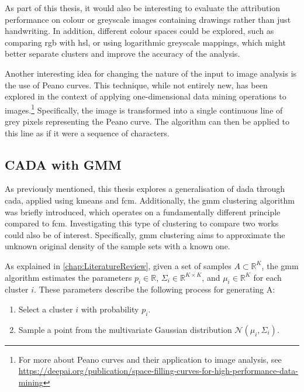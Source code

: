 \begin{toReview}
\noindent As part of this thesis, it would also be interesting to evaluate the attribution performance on colour or greyscale images containing drawings rather than just handwriting. In addition, different colour spaces could be explored, such as comparing \gls{rgb} with \gls{hsl}, or using logarithmic greyscale mappings, which might better separate clusters and improve the accuracy of the analysis.

\noindent Another interesting idea for changing the nature of the input to image analysis is the use of Peano curves. This technique, while not entirely new, has been explored in the context of applying one-dimensional data mining operations to images.\footnote{For more about Peano curves and their application to image analysis, see \\ \url{https://deepai.org/publication/space-filling-curves-for-high-performance-data-mining}} Specifically, the image is transformed into a single continuous line of grey pixels representing the Peano curve. The algorithm can then be applied to this line as if it were a sequence of characters.

\subsection{CADA with GMM}
As previously mentioned, this thesis explores a generalisation of \gls{dada} through \gls{cada}, applied using \gls{kmeans} and \gls{fcm}. Additionally, the \gls{gmm} clustering algorithm was briefly introduced, which operates on a fundamentally different principle compared to \gls{fcm}. Investigating this type of clustering to compare two works could also be of interest. Specifically, \gls{gmm} clustering aims to approximate the unknown original density of the sample sets with a known one.

\noindent As explained in \cref{chap:LiteratureReview}, given a set of samples $A\subset\mathbb{R}^K$, the \gls{gmm} algorithm estimates the parameters $p_i\in \mathbb{R}$, $\Sigma_i\in\mathbb{R}^{K\times K}$, and $\mu_i\in\mathbb{R}^K$ for each cluster $i$. These parameters describe the following process for generating A:
\begin{enumerate}
	\item Select a cluster $i$ with probability $p_i$.
	\item Sample a point from the multivariate Gaussian distribution $\mathcal{N}\left(\mu_i,\Sigma_i\right)$.
\end{enumerate}


\end{toReview}
